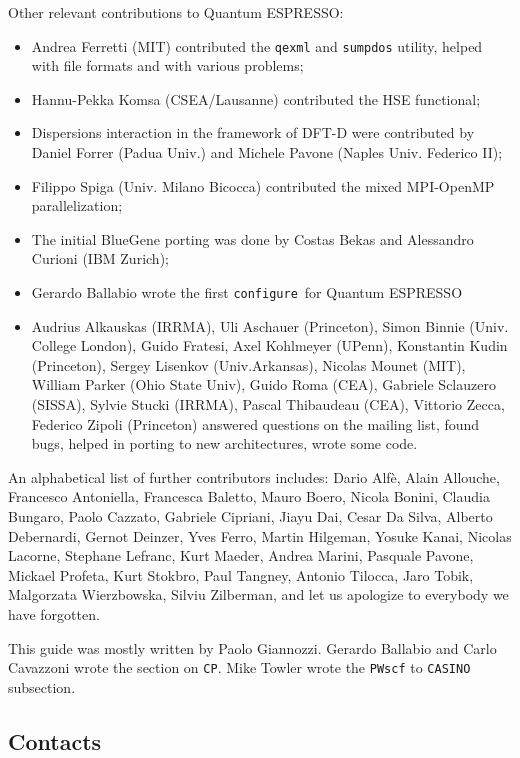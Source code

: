 \documentclass[12pt,a4paper]{article}
\def\qe{{\sc Quantum ESPRESSO}}
\def\configure{\texttt{configure}}
\def\CP{\texttt{CP}}
\begin{document}
Other relevant contributions to \qe:
\begin{itemize}
  \item Andrea Ferretti (MIT) contributed the \texttt{qexml} and
  \texttt{sumpdos} utility,
  helped with file formats and with various problems;
  \item Hannu-Pekka Komsa (CSEA/Lausanne) contributed
  the HSE functional;
  \item Dispersions interaction in the framework of DFT-D were
  contributed by Daniel Forrer (Padua Univ.) and Michele Pavone
  (Naples Univ. Federico II);
 \item Filippo Spiga (Univ. Milano Bicocca) contributed the
  mixed MPI-OpenMP parallelization;
  \item The initial BlueGene porting was done by Costas Bekas and
  Alessandro Curioni (IBM Zurich);
  \item Gerardo Ballabio wrote the first \configure\ for \qe
  \item Audrius Alkauskas (IRRMA), Uli Aschauer (Princeton),
Simon Binnie (Univ. College London), Guido Fratesi, Axel Kohlmeyer (UPenn),
Konstantin Kudin (Princeton), Sergey Lisenkov (Univ.Arkansas), 
Nicolas Mounet (MIT), William Parker (Ohio State Univ), 
Guido Roma (CEA), Gabriele Sclauzero (SISSA), Sylvie Stucki (IRRMA), 
Pascal Thibaudeau (CEA), Vittorio Zecca, Federico Zipoli (Princeton)
answered questions on the mailing list, found bugs, helped in 
porting to new architectures, wrote some code.
\end{itemize}

An alphabetical list of further contributors includes: Dario Alf\`e, 
Alain Allouche, Francesco Antoniella, Francesca Baletto,
Mauro Boero, Nicola Bonini, Claudia Bungaro, 
Paolo Cazzato, Gabriele Cipriani, Jiayu Dai, Cesar Da Silva, 
Alberto Debernardi, Gernot Deinzer, Yves Ferro,
Martin Hilgeman,  Yosuke Kanai, Nicolas Lacorne, Stephane Lefranc,
Kurt Maeder, Andrea Marini, 
Pasquale Pavone,  Mickael Profeta, Kurt Stokbro, 
Paul Tangney, 
Antonio Tilocca, Jaro Tobik, 
Malgorzata Wierzbowska, Silviu Zilberman, 
and let us apologize to everybody we have forgotten.
 
This guide was mostly written by Paolo Giannozzi.
Gerardo Ballabio and Carlo Cavazzoni wrote the section on \CP. Mike Towler
wrote the \texttt{PWscf} to \texttt{CASINO} subsection.

\subsection{Contacts}
\label{SubSec:Contacts}
\end{document}
